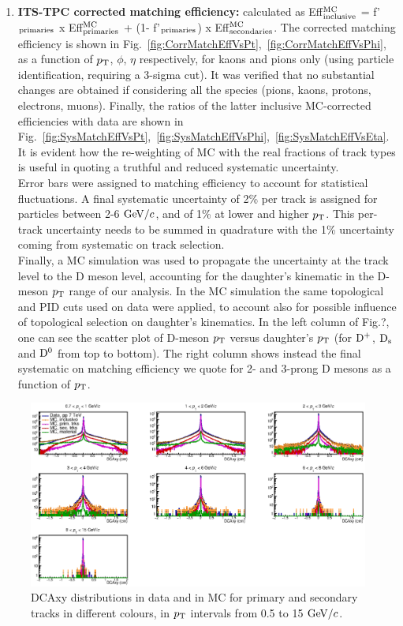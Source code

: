 \begin{enumerate}
\item {\bf ITS-TPC corrected matching efficiency:} calculated 
as  Eff$^{\rm MC}_{\rm inclusive}$ = f'$_{\rm primaries}$ x Eff$^{\rm MC}_{\rm primaries}$ + (1- f'$_{\rm primaries}$) x Eff$^{\rm MC}_{\rm secondaries}$. The corrected matching efficiency 
is shown in Fig.~\ref{fig:CorrMatchEffVsPt},~\ref{fig:CorrMatchEffVsPhi}, 
as a function of $p_{\rm T}$, $\phi$, $\eta$ respectively, for kaons and 
pions only (using particle identification, requiring a 3-sigma cut). 
It was verified that no substantial changes are obtained if 
considering all the species (pions, kaons, protons, electrons, muons). 
Finally, the ratios of the latter inclusive MC-corrected efficiencies with
 data are shown in Fig.~\ref{fig:SysMatchEffVsPt},~\ref{fig:SysMatchEffVsPhi},~\ref{fig:SysMatchEffVsEta}. 
 It is evident how the re-weighting of MC with the real fractions 
of track types is useful in quoting a truthful and reduced systematic uncertainty. \\ 
Error bars were assigned to matching efficiency to account for statistical fluctuations.
A final systematic uncertainty of 2\% per track is assigned for particles 
between 2-6 $\mathrm{GeV}/c$, and of 1\% at lower and higher $p_{\rm T}$.
This per-track uncertainty needs to be summed in quadrature with the 
1\% uncertainty coming from systematic on track selection. \\
Finally, a MC simulation was used to propagate the uncertainty at the 
track level to the D meson level, accounting for the daughter's 
kinematic in the D-meson $p_{\rm T}$ range of our analysis. In the MC 
simulation the same topological and PID cuts used on data were 
applied, to account also for possible influence of topological selection
 on daughter's kinematics. In the left column of 
 Fig.?, one can see the 
scatter plot of D-meson $p_{\rm T}$ versus daughter's $p_{\rm T}$ 
(for ${\rm D^+}$, ${\rm D_s}$ and ${\rm D^0}$ from top to bottom). 
The right column shows instead the final systematic on matching
 efficiency we quote for 2- and 3-prong D mesons as a function of $p_{\rm T}$.
\end{enumerate}

\begin{figure}[!htb]
\begin{center}
\includegraphics[width=.99\textwidth]{FigCap4/FitComponents.eps}
\caption{DCAxy distributions in data and in MC for primary and secondary tracks in different colours, in $p_{\rm T}$ intervals from 0.5 to 15 $\mathrm{GeV}/c$.}
\label{fig:DCAxyDataMCVsPt}
\end{center}
\end{figure}

